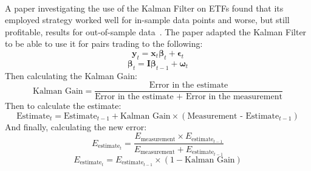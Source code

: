 \\[3mm]
A paper investigating the use of the Kalman Filter on ETFs found that its employed strategy worked well for in-sample data points and worse, but still profitable, results for out-of-sample data~\cite{dempsey_market_2017}. The paper adapted the Kalman Filter to be able to use it for pairs trading to the following: $$\mathbf{y}_t = \mathbf{x}_t \mathbf{\beta}_t + \mathbf{\epsilon}_t$$ $$\mathbf{\beta}_t = \mathbf{I} \mathbf{\beta}_{t-1} + \mathbf{\omega}_t$$ Then calculating the Kalman Gain: $$\text{Kalman Gain} = \frac{\text{Error in the estimate}}{\text{Error in the estimate + Error in the measurement}}$$ Then to calculate the estimate: $$\text{Estimate}_t = \text{Estimate}_{t-1} + \text{Kalman Gain} \times (\text{Measurement - }\text{Estimate}_{t-1})$$ And finally, calculating the new error: $$E_{\text{estimate}_t} = \frac{E_{\text{measurement}} \times E_{\text{estimate}_{t-1}}}{E_{\text{measurement}} + E_{\text{estimate}_{t-1}}}$$ $$E_{\text{estimate}_t} = E_{\text{estimate}_{t-1}} \times (1 - \text{Kalman Gain})$$


